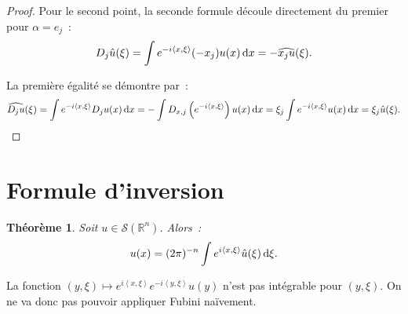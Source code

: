 \documentclass{report}
\newcommand{\R}{{\mathbb R}}
\newcommand{\scpr}[2]{\left\langle#1, #2\right\rangle}
\newcommand{\dx}{\dif x}
\newtheorem{thm}{Théorème}[chapter]
\theoremstyle{definition}
\theoremstyle{remark}
\begin{document}
\begin{proof}
Pour le second point, la seconde formule découle directement du premier pour $\alpha = e_j$~:
\[D_j\hat u(\xi) = \int e^{-i\scpr x\xi}(-x_j)u(x)\dx = -\widehat {x_ju}(\xi).\]

La première égalité se démontre par~:
\[\widehat {D_ju}(\xi) = \int e^{-i\scpr x\xi} D_ju(x)\dx = -\int D_{x,j}\left(e^{-i\scpr x\xi}\right)u(x)\dx = \xi_j\int e^{-i\scpr x\xi}u(x)\dx = \xi_j\hat u(\xi).\]
\end{proof}

\section{Formule d'inversion}

\begin{thm}\label{thm:inversion Fourier} Soit $u \in \mathcal S(\R^n)$. Alors~:
\begin{equation}\label{eq:inversion Fourier}
	u(x) = (2\pi)^{-n}\int e^{i\scpr x\xi}\hat u(\xi)\dif\xi.
\end{equation}
\end{thm}

La fonction $(y, \xi) \mapsto e^{i\scpr x\xi}e^{-i\scpr y\xi}u(y)$ n'est pas intégrable pour $(y, \xi)$. On ne va donc pas pouvoir appliquer Fubini naïvement.
\end{document}
